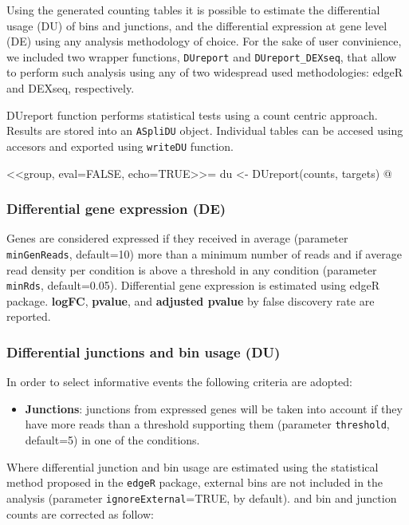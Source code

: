 \documentclass{article}
\begin{document}
Using the generated counting tables it is possible to estimate the differential usage (DU) of bins and junctions, and the differential expression at gene level (DE) using any analysis methodology of choice. For the sake of user convinience, we included two wrapper functions, \texttt{DUreport} and \texttt{DUreport\_DEXseq}, that allow to perform such analysis using any of two widespread used methodologies: edgeR and DEXseq, respectively.

DUreport function performs statistical tests using a count centric approach. Results are stored into an \texttt{ASpliDU} object. Individual tables can be accesed using accesors and exported using \texttt{writeDU} function.

<<group, eval=FALSE, echo=TRUE>>=
du <- DUreport(counts, targets)
@

\subsubsection{Differential gene expression (DE)}
Genes are considered expressed if they received in average (parameter \texttt{minGenReads}, default=10)  more than a minimum number of reads  and if average read density per condition is above a threshold in any condition (parameter \texttt{minRds}, default=0.05). Differential gene expression is estimated using edgeR \cite{Robinson2012} package. \textbf{logFC}, \textbf{pvalue}, and \textbf{adjusted pvalue} by false discovery rate \cite{fdr} are reported. 

\subsubsection{Differential junctions and bin usage (DU)}
In order to select informative events the following criteria are adopted:
  
\begin{itemize}
\item \textbf{Junctions}: junctions from expressed genes will be taken into account if they have more reads than a threshold supporting them (parameter \texttt{threshold}, default=5) in one of the conditions. 
\end{itemize}

Where differential junction and bin usage are estimated using the statistical method proposed in the \texttt{edgeR} package, external bins are not included in the analysis (parameter \texttt{ignoreExternal}=TRUE, by default). 
and bin and junction counts are corrected as follow:
\end{document}
